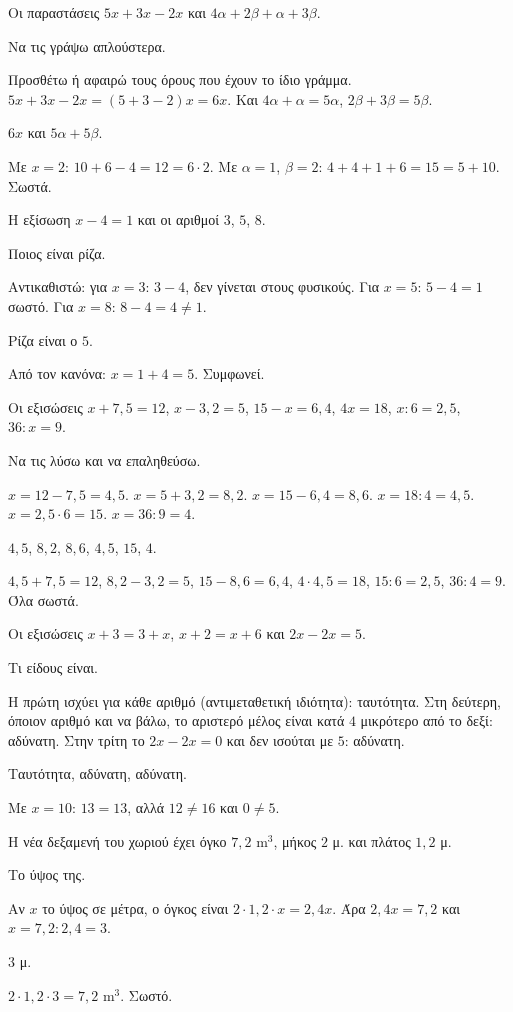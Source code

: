 \tixero Οι παραστάσεις $5x+3x-2x$ και $4\alpha+2\beta+\alpha+3\beta$.\par
\tithelo Να τις γράψω απλούστερα.\par
\possindeo Προσθέτω ή αφαιρώ τους όρους που έχουν το ίδιο γράμμα. $5x+3x-2x=(5+3-2)x=6x$. Και $4\alpha+\alpha=5\alpha$, $2\beta+3\beta=5\beta$.\par
\apantisi $6x$ και $5\alpha+5\beta$.\par
\elegxos Με $x=2$: $10+6-4=12=6\cdot2$. Με $\alpha=1$, $\beta=2$: $4+4+1+6=15=5+10$. Σωστά.

\tixero Η εξίσωση $x-4=1$ και οι αριθμοί $3$, $5$, $8$.\par
\tithelo Ποιος είναι ρίζα.\par
\possindeo Αντικαθιστώ: για $x=3$: $3-4$, δεν γίνεται στους φυσικούς. Για $x=5$: $5-4=1$ σωστό. Για $x=8$: $8-4=4\neq1$.\par
\apantisi Ρίζα είναι ο $5$.\par
\elegxos Από τον κανόνα: $x=1+4=5$. Συμφωνεί.

\tixero Οι εξισώσεις $x+7{,}5=12$, $x-3{,}2=5$, $15-x=6{,}4$, $4x=18$, $x:6=2{,}5$, $36:x=9$.\par
\tithelo Να τις λύσω και να επαληθεύσω.\par
\possindeo $x=12-7{,}5=4{,}5$. $x=5+3{,}2=8{,}2$. $x=15-6{,}4=8{,}6$. $x=18:4=4{,}5$. $x=2{,}5\cdot6=15$. $x=36:9=4$.\par
\apantisi $4{,}5$, $8{,}2$, $8{,}6$, $4{,}5$, $15$, $4$.\par
\elegxos $4{,}5+7{,}5=12$, $8{,}2-3{,}2=5$, $15-8{,}6=6{,}4$, $4\cdot4{,}5=18$, $15:6=2{,}5$, $36:4=9$. Όλα σωστά.

\tixero Οι εξισώσεις $x+3=3+x$, $x+2=x+6$ και $2x-2x=5$.\par
\tithelo Τι είδους είναι.\par
\possindeo Η πρώτη ισχύει για κάθε αριθμό (αντιμεταθετική ιδιότητα): ταυτότητα. Στη δεύτερη, όποιον αριθμό και να βάλω, το αριστερό μέλος είναι κατά $4$ μικρότερο από το δεξί: αδύνατη. Στην τρίτη το $2x-2x=0$ και δεν ισούται με $5$: αδύνατη.\par
\apantisi Ταυτότητα, αδύνατη, αδύνατη.\par
\elegxos Με $x=10$: $13=13$, αλλά $12\neq16$ και $0\neq5$.

\tixero Η νέα δεξαμενή του χωριού έχει όγκο $7{,}2$ m$^3$, μήκος $2$ μ. και πλάτος $1{,}2$ μ.\par
\tithelo Το ύψος της.\par
\possindeo Αν $x$ το ύψος σε μέτρα, ο όγκος είναι $2\cdot1{,}2\cdot x=2{,}4x$. Άρα $2{,}4x=7{,}2$ και $x=7{,}2:2{,}4=3$.\par
\apantisi $3$ μ.\par
\elegxos $2\cdot1{,}2\cdot3=7{,}2$ m$^3$. Σωστό.

